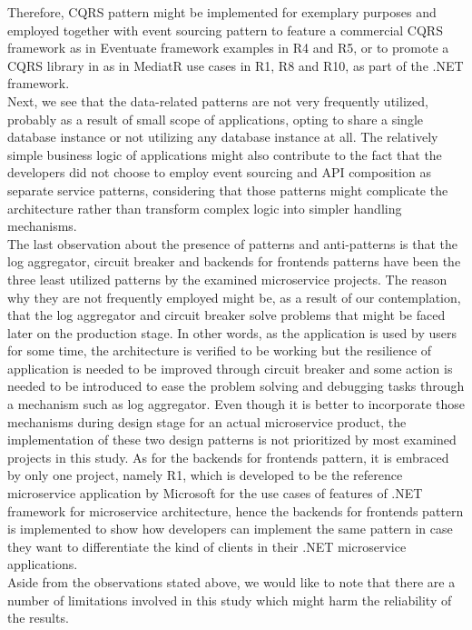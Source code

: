 \documentclass{Configuration_Files/PoliMi3i_thesis}
\begin{document}
Therefore, CQRS pattern might be implemented for exemplary purposes and employed together with event sourcing pattern to feature a commercial CQRS framework as in Eventuate framework examples in R4 and R5, or to promote a CQRS library in as in MediatR use cases in R1, R8 and R10, as part of the .NET framework.
\\
Next, we see that the data-related patterns are not very frequently utilized, probably as a result of small scope of applications, opting to share a single database instance or not utilizing any database instance at all.
The relatively simple business logic of applications might also contribute to the fact that the developers did not choose to employ event sourcing and API composition as separate service patterns, considering that those patterns might complicate the architecture rather than transform complex logic into simpler handling mechanisms.
\\
The last observation about the presence of patterns and anti-patterns is that the log aggregator, circuit breaker and backends for frontends patterns have been the three least utilized patterns by the examined microservice projects.
The reason why they are not frequently employed might be, as a result of our contemplation, that the log aggregator and circuit breaker solve problems that might be faced later on the production stage.
In other words, as the application is used by users for some time, the architecture is verified to be working but the resilience of application is needed to be improved through circuit breaker and some action is needed to be introduced to ease the problem solving and debugging tasks through a mechanism such as log aggregator.
Even though it is better to incorporate those mechanisms during design stage for an actual microservice product, the implementation of these two design patterns is not prioritized by most examined projects in this study.
As for the backends for frontends pattern, it is embraced by only one project, namely R1, which is developed to be the reference microservice application by Microsoft for the use cases of features of .NET framework for microservice architecture, hence the backends for frontends pattern is implemented to show how developers can implement the same pattern in case they want to differentiate the kind of clients in their .NET microservice applications.
\\
Aside from the observations stated above, we would like to note that there are a number of limitations involved in this study which might harm the reliability of the results.
\end{document}
